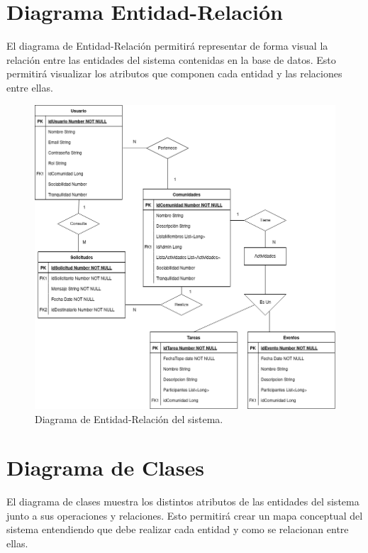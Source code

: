 \section{Diagrama Entidad-Relación}
El diagrama de Entidad-Relación permitirá representar de forma visual la relación entre las entidades del sistema contenidas en la base de datos. Esto permitirá visualizar los atributos que componen cada entidad y las relaciones entre ellas.
\begin{figure}[H]
    \centering
    \includegraphics[width=\textwidth]{fotos/er-final.png}
    \caption{Diagrama de Entidad-Relación del sistema.}
    \label{fig:er-final}
\end{figure}
\newpage
\section{Diagrama de Clases}
El diagrama de clases muestra los distintos atributos de las entidades del sistema junto a sus operaciones y relaciones. Esto  permitirá crear un mapa conceptual del sistema entendiendo que debe realizar cada entidad y como se relacionan entre ellas.

